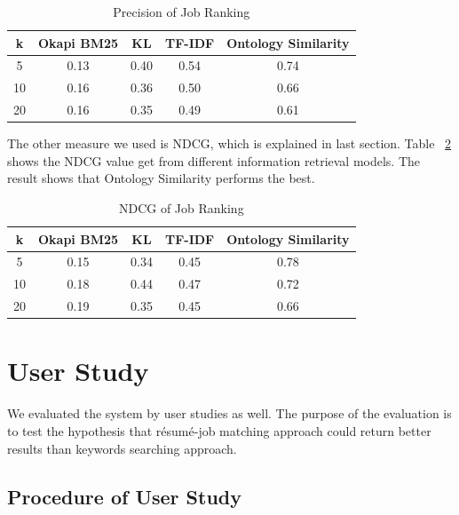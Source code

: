 \begin{table}[ht]
\caption{Precision of Job Ranking } %
\centering %
\begin{tabular}{    | c | c | c | c | c |  }
 \hline
       k     & Okapi BM25 & KL    & TF-IDF   & Ontology Similarity  \\
 \hline
       5     & 0.13       & 0.40  & 0.54     & 0.74   \\
 \hline
       10    & 0.16       & 0.36  & 0.50     & 0.66   \\
 \hline
       20    & 0.16       & 0.35  & 0.49     & 0.61   \\
 \hline

\end{tabular}
\label{tab:job_precision} %
\end{table}

The other measure we used is NDCG, which is explained in last section. Table ~\ref{tab:job_ndcg} shows the NDCG value get from different information retrieval models. The result shows that Ontology Similarity  performs the best. 

\begin{table}[ht]
\caption{NDCG of Job Ranking } %
\centering %
\begin{tabular}{    | c | c | c | c | c |  }
 \hline
       k    & Okapi BM25 & KL    & TF-IDF & Ontology Similarity  \\
 \hline
       5    & 0.15       & 0.34  & 0.45     & 0.78   \\
 \hline
       10   & 0.18       & 0.44  & 0.47     & 0.72   \\
 \hline
       20   & 0.19       & 0.35  & 0.45     & 0.66   \\
 \hline

\end{tabular}
\label{tab:job_ndcg} %
\end{table}

\section{User Study}

We evaluated the system by user studies as well. The purpose of the evaluation is to test the hypothesis that r\'esum\'e-job matching approach could return better results than keywords searching approach.

\subsection{Procedure of User Study}

